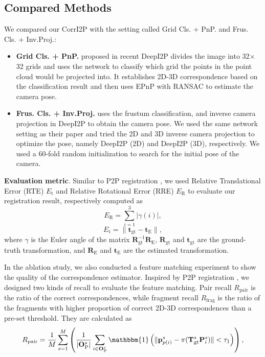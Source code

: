 \documentclass[lettersize,journal]{IEEEtran}
\begin{document}
\subsection{Compared Methods}
We compared our CorrI2P with  the setting called Grid Cls. + PnP. and Frus. Cls. + Inv.Proj.:
\begin{itemize}
\item{\textbf{Grid Cls. + PnP.}}  proposed in recent DeepI2P \cite{DEEPI2P} divides the image into 32$\times$32 grids and uses the network to classify which grid the points in the point cloud would be projected into.
It establishes 2D-3D correspondence based on the classification result and then uses EPnP with RANSAC to estimate the camera pose.

\item{\textbf{Frus. Cls. + Inv.Proj.}}  uses the frustum classification, and inverse camera projection in DeepI2P \cite{DEEPI2P} to obtain the camera pose. We used the same network setting as their paper and tried the 2D and 3D inverse camera projection to optimize the pose, namely DeepI2P (2D) and DeepI2P (3D), respectively. We used a 60-fold random initialization to search for the initial pose of the camera. \\

\end{itemize} 
\textbf{Evaluation metric}.
Similar to P2P registration \cite{METRIC}, we used Relative Translational Error (RTE) $E_\text{t}$ and Relative Rotational Error (RRE) $E_\text{R}$  to evaluate our registration result, respectively computed as 
\begin{equation}
E_\text{R}=\sum_{i=1}^{3}|\gamma(i)|, 
\end{equation}
\begin{equation}
E_\text{t}=\|\mathbf{t}_{\text{gt}}-\mathbf{t}_{\text{E}}\|,
\end{equation}
where $\gamma$ is the Euler angle of the matrix $\mathbf{R}_{\text{gt}}^{-1}\mathbf{R}_{\text{E}}$, $\mathbf{R}_{\text{gt}}$ and $\mathbf{t}_{\text{gt}}$ are the ground-truth transformation, and $\mathbf{R}_{\text{E}}$ and $\mathbf{t}_{\text{E}}$ are the estimated transformation.



In the ablation study, we also conducted a feature matching experiment to show the quality of the correspondence estimator. Inspired by  P2P registration \cite{RECALL}, we designed two kinds of recall to evaluate the feature matching. Pair recall $R_\text{pair}$ is the ratio of the correct correspondences, while fragment recall $R_\text{frag}$ is the ratio of the fragments with higher proportion of correct 2D-3D correspondences than a pre-set threshold. They are calculated as
\begin{equation}
\begin{aligned}
    R_\text{pair}=\frac{1}{M}\sum_{s=1}^{M}\left(\frac{1}{|\mathbf{O}_\text{P}^s|}\sum_{i\in \mathbf{O}_\text{P}^s}\mathbbm{1}\left(\|\mathbf{p}_{p(i)}^s- 
    \pi(\mathbf{T}_\text{gt}^s\mathbf{P}_i^s)\|<\tau_1\right) \right ),
\end{aligned}
\end{equation}
\end{document}
